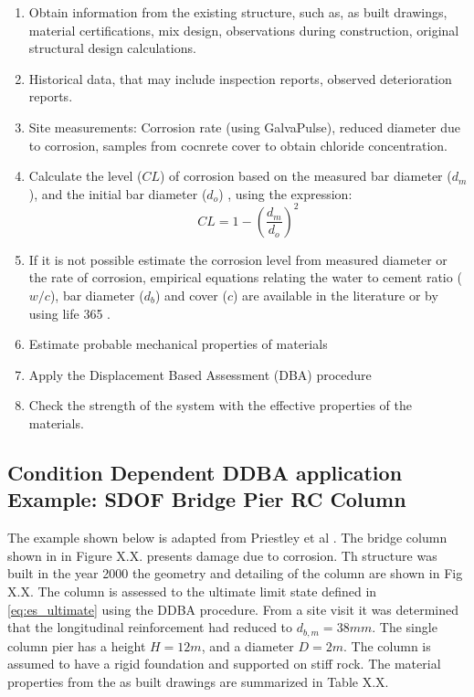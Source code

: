\begin{enumerate}
    \item Obtain information from the existing structure, such as, as built drawings, material certifications, mix design, observations during construction, original structural design calculations.
    \item Historical data, that may include inspection reports, observed deterioration reports.
    \item Site measurements: Corrosion rate (using GalvaPulse), reduced diameter due to corrosion, samples from cocnrete cover to obtain chloride concentration.
    \item Calculate the level ($CL$) of corrosion based on the measured bar diameter ($d_{m}$), and the initial bar diameter ($d_o$) , using the expression: 
    \begin{equation}
        CL=1-\left(\frac{d_{m}}{d_{o}}\right)^2
        \label{eq:CL_diameter}
    \end{equation}
    \item If it is not possible estimate the corrosion level from measured diameter or the rate of corrosion, empirical equations relating the water to cement ratio ($w/c$), bar diameter ($d_{b}$) and cover ($c$) are available in the literature \cite{Weyers1994}\cite{Thoft-Christensen} or by using life 365 \cite{Bentz2003}.
    \item Estimate probable mechanical properties of materials
    \item Apply the Displacement Based Assessment (DBA) procedure
    \item Check the strength of the system with the effective properties of the materials.
\end{enumerate}

\subsection{Condition Dependent DDBA application Example: SDOF Bridge Pier RC Column}

The example shown below is adapted from Priestley et al \cites{Priestley2007}. The bridge column shown in in Figure X.X. presents damage due to corrosion. Th structure was built in the year 2000 the geometry and detailing of the column are shown in Fig X.X. The column is assessed to the ultimate limit state defined in \eqref{eq:es_ultimate} using the DDBA procedure. From a site visit it was determined that the longitudinal reinforcement had reduced to $d_{b,m}=38mm$. The single column pier has a height $H=12m$, and a diameter $D=2m$. The column is assumed to have a rigid foundation and supported on stiff rock. The material properties from the as built drawings are summarized in Table X.X.


